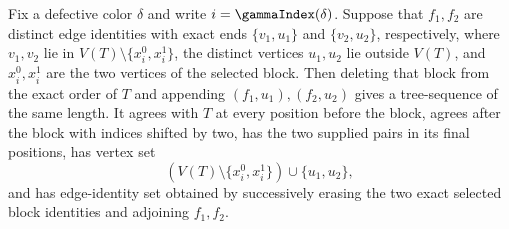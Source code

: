 \begin{helper}
Fix a defective color $\delta$ and write $i=\gammaIndex(\delta)$.  Suppose
that $f_1,f_2$ are distinct edge identities with exact ends
$\{v_1,u_1\}$ and $\{v_2,u_2\}$, respectively, where $v_1,v_2$ lie in
$V(T)\setminus\{x_i^0,x_i^1\}$, the distinct vertices $u_1,u_2$ lie
outside $V(T)$, and $x_i^0,x_i^1$ are the two vertices of the selected
block.  Then deleting that block from the exact order of $T$ and appending
$(f_1,u_1),(f_2,u_2)$ gives a tree-sequence of the same length.  It agrees
with $T$ at every position before the block, agrees after the block with
indices shifted by two, has the two supplied pairs in its final
positions, has vertex set
\[
 (V(T)\setminus\{x_i^0,x_i^1\})\cup\{u_1,u_2\},
\]
and has edge-identity set obtained by successively erasing the two exact
selected block identities and adjoining $f_1,f_2$.
\end{helper}
